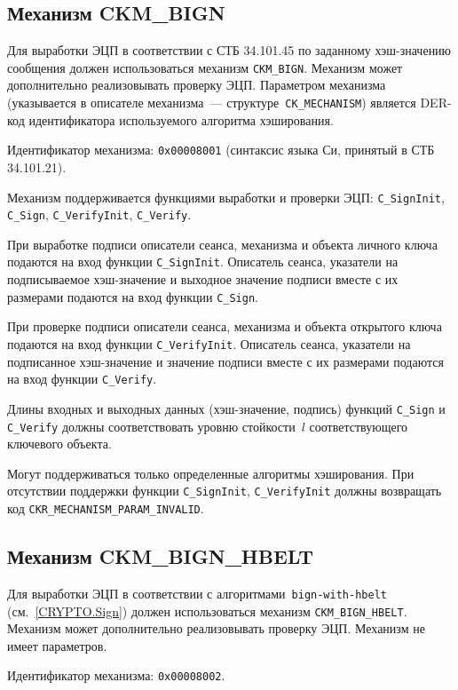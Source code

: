 \subsection{Механизм CKM\_BIGN}\label{CRYPTOKI.SignHSpec}

Для выработки ЭЦП в соответствии с СТБ 34.101.45 по заданному хэш-значению 
сообщения должен использоваться механизм \verb|CKM_BIGN|. Механизм может 
дополнительно реализовывать проверку ЭЦП. 
%
Параметром механизма (указывается в описателе механизма~--- 
структуре~\verb|CK_MECHANISM|) является DER-код идентификатора 
используемого алгоритма хэширования.

Идентификатор механизма: \texttt{0x00008001} 
(синтаксис языка Си, принятый в СТБ 34.101.21). 

Механизм поддерживается функциями выработки и проверки ЭЦП: 
\verb|C_SignInit|, \verb|C_Sign|, \verb|C_VerifyInit|, \verb|C_Verify|.

При выработке подписи описатели сеанса, механизма и объекта
личного ключа подаются на вход функции \verb|C_SignInit|.
Описатель сеанса, указатели на подписываемое хэш-значение и выходное 
значение подписи вместе с их размерами подаются на вход функции 
\verb|C_Sign|.

При проверке подписи описатели сеанса, механизма и объекта
открытого ключа подаются на вход функции \verb|C_VerifyInit|.
Описатель сеанса, указатели на подписанное хэш-значение и значение подписи 
вместе с их размерами подаются на вход функции \verb|C_Verify|.

Длины входных и выходных данных (хэш-значение, подпись) функций
\verb|C_Sign| и \verb|C_Verify| должны соответствовать
уровню стойкости~$l$ соответствующего ключевого объекта.

Могут поддерживаться только определенные алгоритмы хэширования.
При отсутствии поддержки функции \verb|C_SignInit|,
\verb|C_VerifyInit| должны возвращать код 
\verb|CKR_MECHANISM_PARAM_INVALID|.

\subsection{Механизм CKM\_BIGN\_HBELT}\label{CRYPTOKI.SignHBelt}

Для выработки ЭЦП в соответствии с алгоритмами~\texttt{bign-with-hbelt} 
(см.~\ref{CRYPTO.Sign}) должен использоваться механизм \verb|CKM_BIGN_HBELT|. 
Механизм может дополнительно реализовывать проверку ЭЦП. 
%
Механизм не имеет параметров.

Идентификатор механизма: \texttt{0x00008002}.


